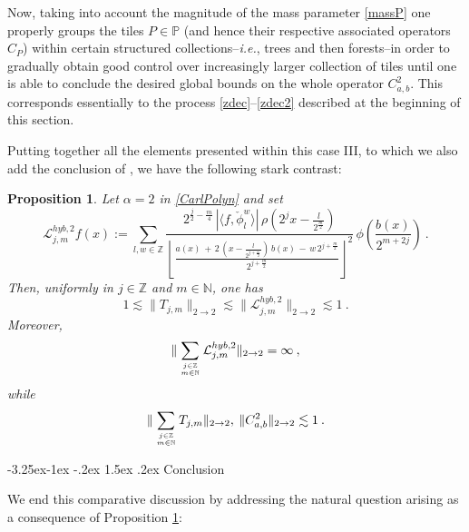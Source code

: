 \documentclass[a4paper,reqno]{amsart}
\makeatletter
\def\subsection{\@startsection{subsection}{2}{\z@}%
	{-3.25ex\@plus -1ex \@minus -.2ex}%
	{1.5ex \@plus .2ex}%
	{\normalfont\bfseries\boldmath}}
\numberwithin{equation}{section}
\newtheorem{proposition}[theorem]{Proposition}
\theoremstyle{definition}
\newcommand{\Z}{\mathbb{Z}}
\newcommand{\N}{\mathbb{N}}
\renewcommand{\P}{\mathbb{P}}
\def\a{\alpha}
\makeatother
\begin{document}
Now, taking into account the magnitude of the mass parameter \eqref{massP} one properly groups the tiles $P\in\P$ (and hence their respective associated operators $C_P$) within certain structured collections--\textit{i.e.}, trees and then forests--in order to gradually obtain good control over increasingly larger collection of tiles until one is able to conclude the desired global bounds on the whole operator $C_{a,b}^{2}$.  This corresponds essentially to the process \eqref{zdec}--\eqref{zdec2} described at the beginning of this section.

Putting together all the elements presented within this case III, to which we also add the conclusion of \cite{Lie09}, we have the following stark contrast:

\begin{proposition} \label{hybcurv2} Let $\a=2$ in \eqref{CarlPolyn} and set
\begin{equation}\label{CarlPolynestKey3}
	\mathcal{L}_{j,m}^{hyb,2} f(x):=\sum_{l,w\in\Z} \frac{2^{\frac{j}{2}-\frac{m}{4}}\,|\langle f,  \check{\phi}_{l}^w\rangle|\,\rho(2^{j}x-\frac{l}{2^{\frac{m}{2}}})}
	{\left\lfloor\frac{a(x)\,+\,2\,\left(x-\frac{l}{2^{j+\frac{m}{2}}}\right)\,b(x)\,-\,w\,2^{j+\frac{m}{2}}}{2^{j+\frac{m}{2}}}\right\rfloor^2}\,
	\phi\left(\frac{b(x)}{2^{m+2j}}\right)\:.
\end{equation}
Then, uniformly in $j\in\Z$ and $m\in\N$, one has
	\begin{equation}\label{CarlPolynestKey1hybcurv2}
		1\lesssim \|T_{j,m}\|_{2\rightarrow 2}\lesssim \|\mathcal{L}_{j,m}^{hyb,2} \|_{2\rightarrow 2}\lesssim 1\:.
	\end{equation}
Moreover,
	\begin{equation}\label{CarlPolynestKey1purelycurvGH2(L)}
		\|\sum_{{j\in\Z}\atop{m\in\N}} \mathcal{L}_{j,m}^{hyb,2}\|_{2\rightarrow 2}=\infty\:,
	\end{equation}
	while
	\begin{equation}\label{CarlPolynestKey1purelycurvGH2(T)}
		\|\sum_{{j\in\Z}\atop{m\in\N}} T_{j,m}\|_{2\rightarrow 2},\:\|C_{a,b}^{2}\|_{2\rightarrow 2}\lesssim 1\:.
	\end{equation}
\end{proposition}

\subsection{Conclusion}

We end this comparative discussion by addressing the natural question arising as a consequence of Proposition \ref{hybcurv2}:
\medskip
\end{document}
